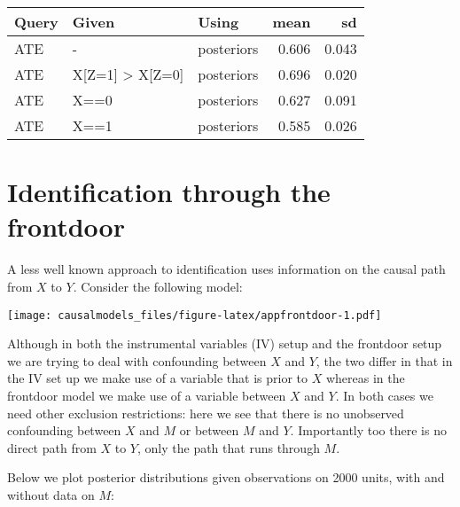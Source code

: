 \documentclass[
  12pt,
]{book}
\newenvironment{Shaded}{\begin{snugshade}}{\end{snugshade}}
\newcommand{\DataTypeTok}[1]{\textcolor[rgb]{0.13,0.29,0.53}{#1}}
\newcommand{\KeywordTok}[1]{\textcolor[rgb]{0.13,0.29,0.53}{\textbf{#1}}}
\newcommand{\NormalTok}[1]{#1}
\newcommand{\OperatorTok}[1]{\textcolor[rgb]{0.81,0.36,0.00}{\textbf{#1}}}
\newcommand{\StringTok}[1]{\textcolor[rgb]{0.31,0.60,0.02}{#1}}
\begin{document}
\begin{tabular}{l|l|l|r|r}
\hline
Query & Given & Using & mean & sd\\
\hline
ATE & - & posteriors & 0.606 & 0.043\\
\hline
ATE & X[Z=1] > X[Z=0] & posteriors & 0.696 & 0.020\\
\hline
ATE & X==0 & posteriors & 0.627 & 0.091\\
\hline
ATE & X==1 & posteriors & 0.585 & 0.026\\
\hline
\end{tabular}

\hypertarget{identification-through-the-frontdoor}{%
\section{Identification through the frontdoor}\label{identification-through-the-frontdoor}}

A less well known approach to identification uses information on the causal path from \(X\) to \(Y\). Consider the following model:

\begin{Shaded}
\end{Shaded}

\texttt{[image: causalmodels\_files/figure-latex/appfrontdoor-1.pdf]}

Although in both the instrumental variables (IV) setup and the frontdoor setup we are trying to deal with confounding between \(X\) and \(Y\), the two differ in that in the IV set up we make use of a variable that is prior to \(X\) whereas in the frontdoor model we make use of a variable between \(X\) and \(Y\). In both cases we need other exclusion restrictions: here we see that there is no unobserved confounding between \(X\) and \(M\) or between \(M\) and \(Y\). Importantly too there is no direct path from \(X\) to \(Y\), only the path that runs through \(M\).

Below we plot posterior distributions given observations on 2000 units, with and without data on \(M\):
\end{document}
